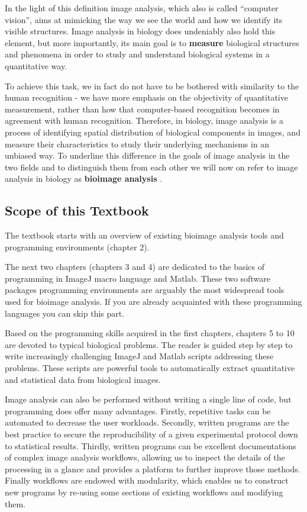 In the light of this definition image analysis, which also is called ``computer vision'',
aims at mimicking the way we see the world and how we identify its visible structures. Image
analysis in biology does undeniably also hold this element, but more importantly, its main goal is to \textbf{measure} biological structures and phenomena in order to study and understand biological systems in a quantitative way.

To achieve this task, we in fact do not have to be bothered with
similarity to the human recognition - we have more emphasis on the
objectivity of quantitative measurement, rather than how that
computer-based recognition becomes in agreement with human recognition.
Therefore, in biology, image analysis is a process of identifying
spatial distribution of biological components in images, and measure
their characteristics to study
their underlying mechanisms in an unbiased way. To underline this difference in the goals of image analysis in
the two fields and to distinguish them from each other we will now on refer to image analysis in biology as
\textbf{bioimage analysis} .

\subsection{Scope of this Textbook}\label{scope-of-this-textbook}

The textbook starts with an overview of existing bioimage analysis tools and programming environments (chapter 2).

The next two chapters (chapters 3 and 4) are dedicated to the basics of programming in ImageJ macro language and Matlab.  These two software packages programming environments are arguably the most widespread tools used for bioimage analysis. If you are already acquainted with these programming languages you can skip this part.

Based on the programming skills acquired in the first chapters, chapters 5 to 10 are devoted to typical biological problems. The reader is guided step by step to write increasingly challenging ImageJ and Matlab scripts addressing these problems. These scripts are powerful tools to automatically extract quantitative and statistical data from biological images.

Image analysis can also be performed without writing a single line of code, but programming
does offer many advantages. 
Firstly, repetitive tasks can be automated to decrease the user workloads. 
Secondly, written programs are the best practice to secure the reproducibility of a given experimental protocol down to statistical results. 
Thirdly, written programs can be excellent documentations of
complex image analysis workflows, allowing us to inspect the details of the processing in a glance and provides a platform to further improve those methods.
Finally workflows are endowed with modularity, which enables us to construct new programs by re-using some sections of existing workflows and modifying them.

